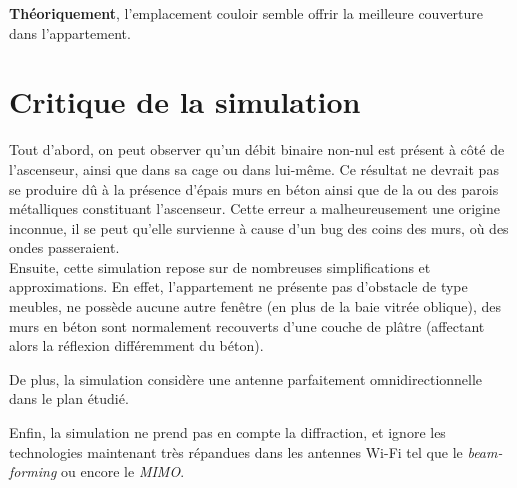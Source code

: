\textbf{Théoriquement}, l'emplacement couloir semble offrir la meilleure couverture dans l'appartement.

\section{Critique de la simulation}

Tout d'abord, on peut observer qu'un débit binaire non-nul est présent à côté de l'ascenseur, ainsi que dans sa cage ou dans lui-même. Ce résultat ne devrait pas se produire dû à la présence d'épais murs en béton ainsi que de la ou des parois métalliques constituant l'ascenseur. Cette erreur a malheureusement une origine inconnue, il se peut qu'elle survienne à cause d'un bug des coins des murs, où des ondes passeraient.\\

Ensuite, cette simulation repose sur de nombreuses simplifications et approximations. En effet, l'appartement ne présente pas d'obstacle de type meubles, ne possède aucune autre fenêtre (en plus de la baie vitrée oblique), des murs en béton sont normalement recouverts d'une couche de plâtre (affectant alors la réflexion différemment du béton). 

De plus, la simulation considère une antenne parfaitement omnidirectionnelle dans le plan étudié. 

Enfin, la simulation ne prend pas en compte la diffraction, et ignore les technologies maintenant très répandues dans les antennes Wi-Fi tel que le \textit{beam-forming} ou encore le \textit{MIMO}.
